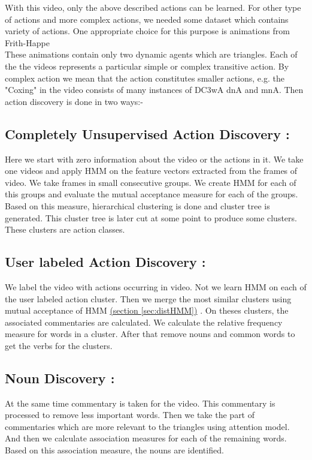 \def\DevnagVersion{2.15}\documentclass[a4paper, 11pt, notitlepage]{report}
\begin{document}
With this video, only the above described actions can be learned. For other type of actions and more complex actions, we needed some dataset which contains variety of actions. One appropriate choice for this purpose is animations from Frith-Happe\cite{fhanimation}\\

\hspace*{10pt} These animations contain only two dynamic agents which are triangles. Each of the the videos represents a particular simple or complex transitive action. By complex action we mean that the action constitutes smaller actions, e.g. the "Coxing" in the video consists of many instances of {\dn D\3C3wA d\?nA} and {\dn {}mnA}. Then action discovery is done in two ways:- \\

\subsection{Completely Unsupervised Action Discovery :}

Here we start with zero information about the video or the actions in it. We take one videos and apply HMM  on the feature vectors extracted from the frames of video. We take frames in small consecutive groups. We create HMM for each of this groups and evaluate the mutual acceptance measure for each of the groups. Based on this measure, hierarchical clustering is done and cluster tree is generated. This cluster tree is later cut at some point to produce some clusters. These clusters are action classes.\\

\subsection{User labeled Action Discovery :} 

We label the video with actions occurring in video. Not we learn HMM on each of the user labeled action cluster. Then we merge the most similar clusters using mutual acceptance of HMM \hyperref[sec:distHMM]{(section \ref*{sec:distHMM})} . On theses clusters, the associated commentaries are calculated. We calculate the relative frequency measure for words in a cluster. After that remove nouns and common words to get the verbs for the clusters.\\

\subsection{Noun Discovery : } At the same time commentary is taken for the video. This commentary is processed to remove less important words. Then we take the part of commentaries which are more relevant to the triangles using attention model. And then we calculate association measures for each of the remaining words. Based on this association measure, the nouns are identified.\\
\end{document}
